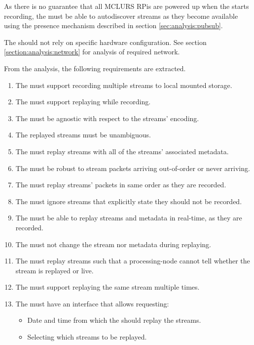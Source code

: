 As there is no guarantee that all \ac{MCLURS} RPis are powered up when the  starts recording, the  must be able to autodiscover streams as they become available using the presence mechanism described in section \ref{sec:analysis:pubsub}.

The  should not rely on specific hardware configuration. See section \ref{section:analysis:network} for analysis of required network.


From the analysis, the following requirements are extracted.
\begin{enumerate}
	\item The  must support recording multiple streams to local mounted storage.
	\item The  must support replaying while recording.
	\item The  must be agnostic with respect to the streams' encoding.
	\item The replayed streams must be unambiguous.
	\item The  must replay streams with all of the streams' associated metadata.
	\item The  must be robust to stream packets arriving out-of-order or never arriving.
	\item The  must replay streams' packets in same order as they are recorded.
	\item The  must ignore streams that explicitly state they should not be recorded.
	\item The  must be able to replay streams and metadata in real-time, as they are recorded.
	\item The  must not change the stream nor metadata during replaying.
	\item The  must replay streams such that a processing-node cannot tell whether the stream is replayed or live.
	\item The  must support replaying the same stream multiple times.
	\item The  must have an interface that allows requesting:
	\begin{itemize}
		\item Date and time from which the  should replay the streams.
		\item Selecting which streams to be replayed.

\end{itemize}
\end{enumerate}
